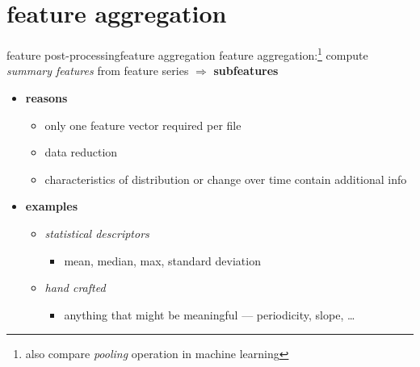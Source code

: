     \section[aggregation]{feature aggregation}
		\begin{frame}{feature post-processing}{feature aggregation}
            feature aggregation:\footnote{also compare \textit{pooling} operation in machine learning} compute \textit{summary features} from feature series $\Rightarrow$ \textbf{subfeatures} 
            
            \bigskip
            \begin{itemize}
                \item \textbf{reasons}
                    \begin{itemize}
                        \item   only one feature vector required per file
                        \item   data reduction
                        \item   characteristics of distribution or change over time contain additional info
                    \end{itemize}
                \smallskip
                \item   \textbf{examples}
                    \begin{itemize}
                        \item   \textit{statistical descriptors}
                            \begin{itemize}
                                \item   mean, median, max, standard deviation
                            \end{itemize}
                                
                        \item   \textit{hand crafted }
                            \begin{itemize}
                                \item anything that might be meaningful --- periodicity, slope, \ldots
                            \end{itemize}
                    \end{itemize}
            \end{itemize}
		\end{frame}

